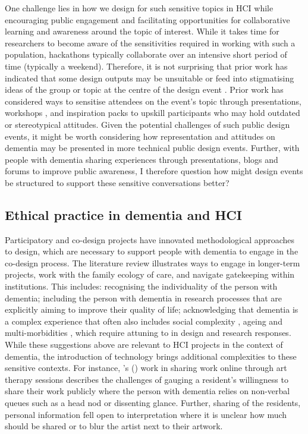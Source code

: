 One challenge lies in how we design for such sensitive topics in HCI while encouraging public engagement and facilitating opportunities for collaborative learning and awareness around the topic of interest. While it takes time for researchers to become aware of the sensitivities required in working with such a population, hackathons typically collaborate over an intensive short period of time (typically a weekend). Therefore, it is not surprising that prior work has indicated that some design outputs may be unsuitable or feed into stigmatising ideas of the group or topic at the centre of the design event \citep{toros_co-creation_2020}. Prior work has considered ways to sensitise attendees on the event's topic through presentations, workshops \citep{hope_hackathons_2019}, and inspiration packs \citep{birbeck_self_2017} to upskill participants who may hold outdated or stereotypical attitudes. Given the potential challenges of such public design events, it might be worth considering how representation and attitudes on dementia may be presented in more technical public design events. Further, with people with dementia sharing experiences through presentations, blogs and forums to improve public awareness, I therefore question how might design events be structured to support these sensitive conversations better?

\subsection{Ethical practice in dementia and HCI}
\label{BL:gap:Ethics}
Participatory and co-design projects have innovated methodological approaches to design, which are necessary to support people with dementia to engage in the co-design process. The literature review illustrates ways to engage in longer-term projects, work with the family ecology of care, and navigate gatekeeping within institutions. This includes: recognising the individuality of the person with dementia; including the person with dementia in research processes that are explicitly aiming to improve their quality of life; acknowledging that dementia is a complex experience that often also includes social complexity \citep{keyes2019living}, ageing and multi-morbidities \citep{buse_materialising_2016}, which require attuning to in design and research responses. While these suggestions above are relevant to HCI projects in the context of dementia, the introduction of technology brings additional complexities to these sensitive contexts. For instance, \citeauthor{cornejo_vulnerability_2016}'s (\citeyear{cornejo_vulnerability_2016}) work in sharing work online through art therapy sessions describes the challenges of gauging a resident's willingness to share their work publicly where the person with dementia relies on non-verbal queues such as a head nod or dissenting glance. Further, sharing of the residents, personal information fell open to interpretation where it is unclear how much should be shared or to blur the artist next to their artwork. 


